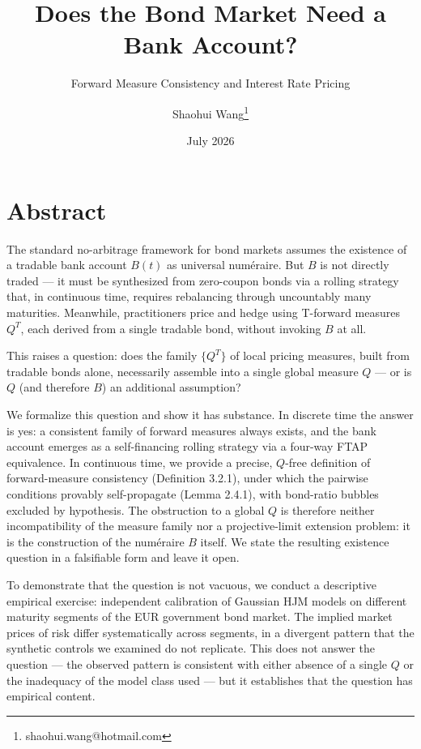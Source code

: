 \documentclass[
]{article}
\title{Does the Bond Market Need a Bank Account?}
\subtitle{Forward Measure Consistency and Interest Rate Pricing}
\author{Shaohui Wang\footnote{shaohui.wang@hotmail.com}}
\date{July 2026}
\begin{document}
\maketitle

\section{Abstract}\label{abstract}

The standard no-arbitrage framework for bond markets assumes the
existence of a tradable bank account \(B(t)\) as universal numéraire.
But \(B\) is not directly traded --- it must be synthesized from
zero-coupon bonds via a rolling strategy that, in continuous time,
requires rebalancing through uncountably many maturities. Meanwhile,
practitioners price and hedge using T-forward measures \(Q^T\), each
derived from a single tradable bond, without invoking \(B\) at all.

This raises a question: does the family \(\{Q^T\}\) of local pricing
measures, built from tradable bonds alone, necessarily assemble into a
single global measure \(Q\) --- or is \(Q\) (and therefore \(B\)) an
additional assumption?

We formalize this question and show it has substance. In discrete time
the answer is yes: a consistent family of forward measures always
exists, and the bank account emerges as a self-financing rolling
strategy via a four-way FTAP equivalence. In continuous time, we provide
a precise, \(Q\)-free definition of forward-measure consistency
(Definition 3.2.1), under which the pairwise conditions provably
self-propagate (Lemma 2.4.1), with bond-ratio bubbles excluded by
hypothesis. The obstruction to a global \(Q\) is therefore neither
incompatibility of the measure family nor a projective-limit extension
problem: it is the construction of the numéraire \(B\) itself. We state
the resulting existence question in a falsifiable form and leave it
open.

To demonstrate that the question is not vacuous, we conduct a
descriptive empirical exercise: independent calibration of Gaussian HJM
models on different maturity segments of the EUR government bond market.
The implied market prices of risk differ systematically across segments,
in a divergent pattern that the synthetic controls we examined do not
replicate. This does not answer the question --- the observed pattern is
consistent with either absence of a single \(Q\) or the inadequacy of
the model class used --- but it establishes that the question has
empirical content.
\end{document}
